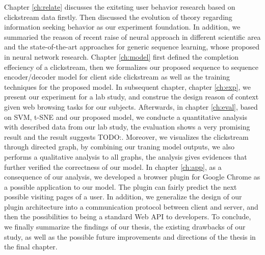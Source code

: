 Chapter \ref{ch:relate} discusses the exitsting user behavior research based on clickstream data firstly. Then discussed the evolution of theory regarding information seeking behavior as our experiment foundation.
In addition, we summaried the reason of recent raise of neural approach in different scientific 
area and the state-of-the-art approaches for generic sequence learning, whose proposed in neural network research.
Chapter \ref{ch:model} first defined the completion effeciency of a clickstream, then we
formalizes our proposed sequence to sequence encoder/decoder model for client side
clickstream as well as the training techniques for the proposed model.
In subsequent chapter, chapter \ref{ch:exp}, we present our experiment for a lab study,
and construe the design reason of context given web browsing tasks for our subjects.
Afterwards, in chapter \ref{ch:eval}, based on SVM, t-SNE and our proposed model, 
we conducte a quantitative analysis with described data from our lab study, 
the evaluation shows a very promising result and the result suggests TODO:. %
Moreover, we visualizes the clickstream through directed graph, by combining our traning model outputs,
we also performs a qualitative analysis to all graphs, the analysis gives evidences that further 
verified the correctness of our model.
In chapter \ref{ch:app}, as a consequence of our analysis, we developed a browser plugin 
for Google Chrome as a possible application to our model. The plugin can fairly predict 
the next possible visiting pages of a user. In addition, we generalize the design of
our plugin architecture into a communication protocol between client and server,
and then the possibilities to being a standard Web API to developers.
To conclude, we finally summarize the findings of our thesis, 
the existing drawbacks of our study, as well as the possible 
future improvements and directions of the thesis in the final chapter.
\cleardoublepage